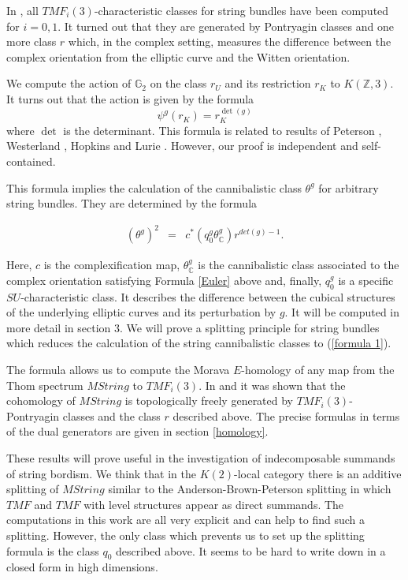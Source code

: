 \documentclass{amsart}
\newcommand {\Z}{{\mathbb Z}}
\newcommand {\C}{{\mathbb C}}
\newcommand {\G}{{\mathbb G}}
\numberwithin{equation}{section}
\theoremstyle{definition}  %
\newtheorem{set theory}[thm]{Set Theoretic Prelude}
\begin{document}
In \cite{MR3448393}, all $TMF_i(3)$-characteristic classes for string bundles have been computed for $i=0,1$. It turned out that they are generated by Pontryagin classes and one more class $r$ which, in the complex setting, measures the difference between the complex orientation from the elliptic curve and the Witten orientation. 

We compute the action of $\G_2$ on the class $r_U$ and its restriction $r_K$  to $K(\Z,3)$. It turns out that the action is given by the formula
$$\psi^g(r_K)=r_K^{\det(g)}$$
where $\det$ is the determinant.
This formula is related to results of Peterson \cite{Pet11}, Westerland \cite[Theorem 3.21]{W13}, Hopkins and Lurie \cite{HL13}. However, our proof is independent and self-contained.


This formula implies the calculation of the cannibalistic class $\theta^g$ for arbitrary string bundles. They are determined by the formula

\begin{eqnarray} \label{formula 1}
 (\theta^g )^2 & = &c^* (q_0^g \theta_\C^g) r^{det(g)-1} .
\end{eqnarray}

Here, $c$ is the complexification map, $\theta_\C^g$ is the cannibalistic class associated to the complex orientation satisfying Formula \ref{Euler} above and, finally,  $q_0^g$ is a specific $SU$-characteristic class. It describes the difference between the cubical structures of the underlying elliptic curves and its perturbation by $g$. It will be computed in more detail in section 3. 
 We will prove a splitting principle for string bundles which reduces the calculation of the string cannibalistic classes to  (\ref{formula 1}).\par
The formula allows us to compute the Morava $E$-homology of any map from the Thom spectrum $MString$ to $TMF_i(3)$. In \cite{MR3448393} and \cite{MR3471093} it was shown that the cohomology of $MString$ is topologically  freely generated  by $TMF_i(3)$-Pontryagin classes and the class $r$ described above.  The precise formulas in terms of the  dual generators  are given in section \ref{homology}.
\par
These results will prove useful in the investigation of indecomposable summands  of  string bordism. We think that in the $K(2)$-local category there is an additive splitting of $MString$ similar to the Anderson-Brown-Peterson splitting in which $TMF$ and $TMF$ with level structures appear as direct summands.
The computations in this work are all very explicit and can help to find such a splitting. However, the only class which prevents us to set up the splitting formula is the class $q_0$ described above. It seems to be hard to write down in a closed form in high dimensions. 
\end{document}
